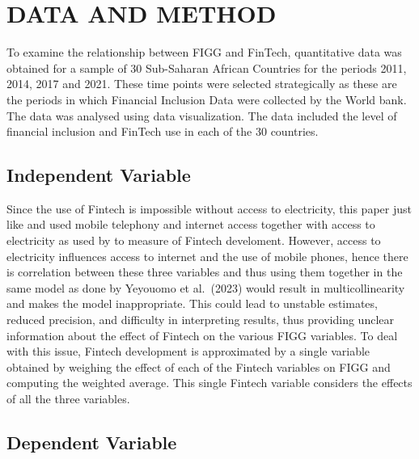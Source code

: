 \documentclass[preprint, 3p,
authoryear]{elsarticle} %
\begin{document}
\hypertarget{data-and-method}{%
\section{DATA AND METHOD}\label{data-and-method}}

To examine the relationship between FIGG and FinTech, quantitative data
was obtained for a sample of 30 Sub-Saharan African Countries for the
periods 2011, 2014, 2017 and 2021. These time points were selected
strategically as these are the periods in which Financial Inclusion Data
were collected by the World bank. The data was analysed using data
visualization. The data included the level of financial inclusion and
FinTech use in each of the 30 countries.

\bigskip

\hypertarget{independent-variable}{%
\subsection{Independent Variable}\label{independent-variable}}

Since the use of Fintech is impossible without access to electricity,
this paper just like \citet{chen2023fintech} and
\citet{demir2022fintech} used mobile telephony and internet access
together with access to electricity as used by
\citet{yeyouomo2023fintechs} to measure of Fintech develoment. However,
access to electricity influences access to internet and the use of
mobile phones, hence there is correlation between these three variables
and thus using them together in the same model as done by Yeyouomo et
al.~(2023) would result in multicollinearity and makes the model
inappropriate. This could lead to unstable estimates, reduced precision,
and difficulty in interpreting results, thus providing unclear
information about the effect of Fintech on the various FIGG variables.
To deal with this issue, Fintech development is approximated by a single
variable obtained by weighing the effect of each of the Fintech
variables on FIGG and computing the weighted average. This single
Fintech variable considers the effects of all the three variables.

\hypertarget{dependent-variable}{%
\subsection{Dependent Variable}\label{dependent-variable}}
\end{document}
